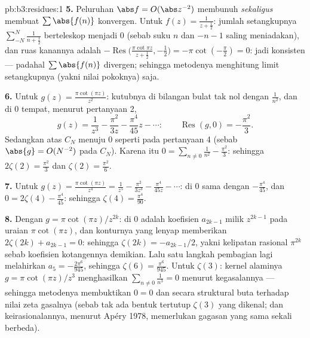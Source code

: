 \begin{solution}{pb:b3:residues:1}
\textbf{5.} Peluruhan $\abs f = O(\abs z^{-2})$ membunuh
 \emph{sekaligus} membuat $\sum\abs{f(n)}$ konvergen.
Untuk $f(z) = \frac1{z + \frac12}$: jumlah setangkupnya
$\sum_{-N}^N\frac1{n + \frac12}$ berteleskop menjadi $0$ (sebab suku
$n$ dan $-n - 1$ saling meniadakan), dan ruas kanannya adalah
$-\operatorname{Res}\bigl(\frac{\pi\cot\pi z}{z + \frac12},
-\frac12\bigr) = -\pi\cot(-\frac\pi2) = 0$: jadi konsisten ---
padahal $\sum\abs{f(n)}$ divergen; sehingga metodenya menghitung
limit setangkupnya (yakni nilai pokoknya) saja.

\textbf{6.} Untuk $g(z) = \frac{\pi\cot(\pi z)}{z^2}$: kutubnya di
bilangan bulat tak nol dengan  $\frac1{n^2}$, dan di $0$
tempat, menurut pertanyaan 2,
\[
g(z) = \frac1{z^3} - \frac{\pi^2}{3z} - \frac{\pi^4}{45}z -
\cdots :
\qquad \operatorname{Res}(g, 0) = -\frac{\pi^2}3 .
\]
Sedangkan  atas $C_N$ menuju $0$ seperti pada pertanyaan 4
(sebab $\abs{g} = O(N^{-2})$ pada $C_N$). Karena itu $0 =
\sum_{n\neq0}\frac1{n^2} - \frac{\pi^2}3$: sehingga $2\zeta(2) =
\frac{\pi^2}3$ dan $\zeta(2) = \frac{\pi^2}6$.

\textbf{7.} Untuk $g(z) = \frac{\pi\cot(\pi z)}{z^4} = \frac1{z^5}
- \frac{\pi^2}{3z^3} - \frac{\pi^4}{45z} - \cdots$: 
di $0$ sama dengan $-\frac{\pi^4}{45}$, dan $0 =
2\zeta(4) - \frac{\pi^4}{45}$: sehingga $\zeta(4) =
\frac{\pi^4}{90}$.

\textbf{8.} Dengan $g = \pi\cot(\pi z)/z^{2k}$:  di
$0$ adalah koefisien $a_{2k-1}$ milik $z^{2k-1}$ pada
uraian $\pi\cot(\pi z)$, dan konturnya yang lenyap memberikan
$2\zeta(2k) + a_{2k-1} = 0$: sehingga $\zeta(2k) = -a_{2k-1}/2$, yakni
kelipatan rasional $\pi^{2k}$ sebab koefisien
kotangennya demikian. Lalu satu langkah pembagian lagi melahirkan $a_5 =
-\frac{2\pi^6}{945}$, sehingga $\zeta(6) = \frac{\pi^6}{945}$.
Untuk $\zeta(3)$: kernel alaminya $g = \pi\cot(\pi z)/z^3$
menghasilkan $\sum_{n\neq0}\frac1{n^3} = 0$ menurut kegasalannya --- sehingga
metodenya membuktikan $0 = 0$ dan secara struktural buta terhadap nilai zeta
gasalnya (sebab tak ada bentuk tertutup $\zeta(3)$ yang dikenal; dan
keirasionalannya, menurut Apéry 1978, memerlukan gagasan yang sama sekali
berbeda).


\end{solution}

